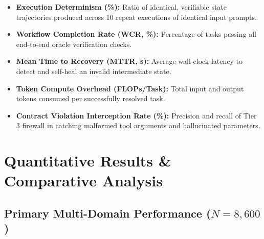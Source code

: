 \documentclass[10pt,twocolumn,letterpaper]{article}
\begin{document}
\begin{itemize}
  \item \textbf{Execution Determinism (\%):} Ratio of identical, verifiable state trajectories produced across 10 repeat executions of identical input prompts.
  \item \textbf{Workflow Completion Rate (WCR, \%):} Percentage of tasks passing all end-to-end oracle verification checks.
  \item \textbf{Mean Time to Recovery (MTTR, s):} Average wall-clock latency to detect and self-heal an invalid intermediate state.
  \item \textbf{Token Compute Overhead (FLOPs/Task):} Total input and output tokens consumed per successfully resolved task.
  \item \textbf{Contract Violation Interception Rate (\%):} Precision and recall of Tier 3 firewall in catching malformed tool arguments and hallucinated parameters.
\end{itemize}




\section{Quantitative Results \& Comparative Analysis}



\subsection{Primary Multi-Domain Performance ($N = 8,600$)}


\begin{table}[htbp]
\centering
\caption{Multi-Domain Benchmark Results Across $N = 8,600$ Enterprise Workflows}
\end{table}
\end{document}
